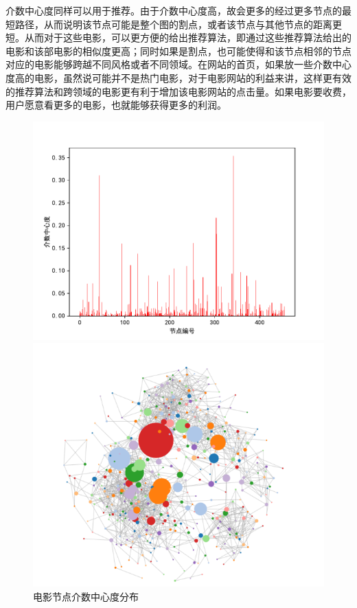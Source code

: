\documentclass[UTF8, onecolumn, a4paper]{article}
\begin{document}
    介数中心度同样可以用于推荐。由于介数中心度高，故会更多的经过更多节点的最短路径，从而说明该节点可能是整个图的割点，或者该节点与其他节点的距离更短。从而对于这些电影，可以更方便的给出推荐算法，即通过这些推荐算法给出的电影和该部电影的相似度更高；同时如果是割点，也可能使得和该节点相邻的节点对应的电影能够跨越不同风格或者不同领域。在网站的首页，如果放一些介数中心度高的电影，虽然说可能并不是热门电影，对于电影网站的利益来讲，这样更有效的推荐算法和跨领域的电影更有利于增加该电影网站的点击量。如果电影要收费，用户愿意看更多的电影，也就能够获得更多的利润。
\begin{center}
	\begin{figure}[ht] %
		\centering %
		\begin{minipage}[b]{0.95\linewidth} %
			\begin{minipage}[b]{0.47\linewidth} %
				\centering
				\includegraphics[width=\linewidth]{../pictures/movie_betweeness}
				\caption{电影节点介数中心度分布}
			\end{minipage}
			\hfill
			\begin{minipage}[b]{0.46\linewidth}
				\centering
				\includegraphics[width=\linewidth]{../pictures/show11}

\end{minipage}
\end{minipage}
\end{figure}
\end{center}
\end{document}
